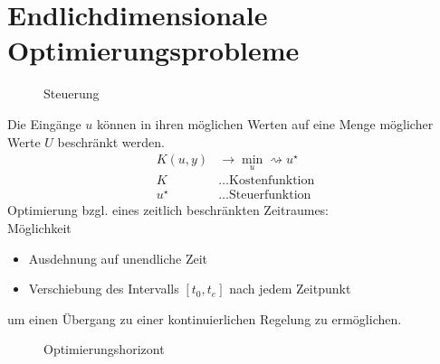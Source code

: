 \chapter{Endlichdimensionale Optimierungsprobleme}
\begin{figure}[htb]
	\centering
	
	\caption{Steuerung}
	\label{fig:kap_1_steuerung}
\end{figure}
Die Eingänge $u$ können in ihren möglichen Werten auf eine Menge möglicher Werte $U$ beschränkt werden.
\begin{align*}
K(u,y) & \rightarrow \min\limits_u\rightsquigarrow u^{\star}\\
K & \ldots \text{Kostenfunktion}\\
u^{\star} & \ldots \text{Steuerfunktion}
\end{align*}
Optimierung bzgl. eines zeitlich beschränkten Zeitraumes:\\
Möglichkeit
\begin{itemize}
  \item Ausdehnung auf unendliche Zeit
  \item Verschiebung des Intervalls $[t_0,t_e]$ nach jedem Zeitpunkt
\end{itemize}
um einen Übergang zu einer kontinuierlichen Regelung zu ermöglichen.
\begin{figure}[htb]
	\centering
	
	\caption{Optimierungshorizont}
	\label{fig:kap_1_horizont}
\end{figure}
